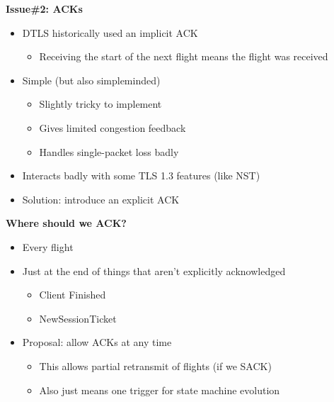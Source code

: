 \documentclass[helvetica]{seminar}
\newcommand{\heading}[1]{%
  \begin{center} 
    \large\bf 
    #1 
  \end{center} 
  \vspace{.4 in}}
\begin{document}
\begin{slide}
\heading{Issue\#2: ACKs}

\begin{itemize}
\item DTLS historically used an implicit ACK
  \begin{itemize}
  \item Receiving the start of the next flight means the flight was received
  \end{itemize}

\item Simple (but also simpleminded)
  \begin{itemize}
  \item Slightly tricky to implement
  \item Gives limited congestion feedback
  \item Handles single-packet loss badly
  \end{itemize}

\item Interacts badly with some TLS 1.3 features (like NST)
\item Solution: introduce an explicit ACK
\end{itemize}
\end{slide}


\begin{slide}
\heading{Where should we ACK?}

\begin{itemize}
\item Every flight
\item Just at the end of things that aren't explicitly acknowledged
  \begin{itemize}
  \item Client Finished
  \item NewSessionTicket
  \end{itemize}

\item Proposal: allow ACKs at any time
  \begin{itemize}
  \item This allows partial retransmit of flights (if we SACK)
  \item Also just means one trigger for state machine evolution
  \end{itemize}
\end{itemize}
\end{slide}
\end{document}
